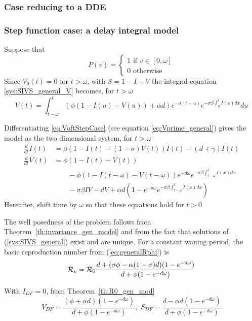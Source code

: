 \documentclass[aspectratio=169]{beamer}\usepackage[]{graphicx}\usepackage[]{xcolor}
\begin{document}
\subsubsection{Case reducing to a DDE}
\begin{frame}\frametitle{Step function case: a delay integral model}
Suppose that
\[ 
P(v)=
\left\{
\begin{array}{l}
1\textrm{ if }v\in[0,\omega] \\
0\textrm{ otherwise} 
\end{array}
\right.
\]
Since $V_0(t)=0$ for $t>\omega$, with $S=1-I-V$ the
integral equation \eqref{sys:SIVS_general_V} becomes, for $t>\omega$
\begin{equation}
  V(t)=\int_{t-\omega}^t(\phi (1-I(u)-V(u))+\alpha d)e^{-d(t-u)}
  e^{-\sigma\beta\int_u^tI(x)dx}du
  \label{eq:VoftStepCase}
\end{equation}
\end{frame}

\begin{frame}
Differentiating \eqref{eq:VoftStepCase} (see equation
\eqref{eq:Vprime_general}) gives the model as the two
dimensional system, for $t>\omega$
\begin{subequations}\label{sys:SIVS_DDE}
\begin{align}
  \frac{d}{dt}I(t) &= 
  \beta(1-I(t)-(1-\sigma)V(t))I(t)-(d+\gamma)I(t) \label{sys:SIVS_DDE_dS} \\
  \frac{d}{dt}V(t) &=
  \phi(1-I(t)-V(t)) \label{sys:SIVS_DDE_dV}\\
  &\qquad-\phi(1-I(t-\omega)-V(t-\omega))e^{-d\omega}
  e^{-\sigma\beta\int_{t-\omega}^t I(x)dx} \nonumber \\
  &\qquad -\sigma\beta IV-dV
  +\alpha d\left(1-e^{-d\omega}e^{-\sigma\beta\int_{t-\omega}^t I(x)dx}
  \right) \nonumber
\end{align}
\end{subequations}
Hereafter, shift time by $\omega$ so that these equations hold for $t>0$
\end{frame}


\begin{frame}
The well posedness of the problem follows from
Theorem~\ref{th:invariance_gen_model} and from the fact that solutions
of (\ref{sys:SIVS_general}) exist and are unique.
For a constant waning period, the basic reproduction number from
(\ref{eq:generalRphi}) is
\begin{equation}
 \mathcal{R}_v = \mathcal{R}_0
 \frac{d+(\sigma\phi-\alpha(1-\sigma)d)
 (1-e^{-d\omega})}{d+\phi(1-e^{-d\omega})}
 \label{eq:Rphi}
\end{equation}


With $I_{DF}=0$, from Theorem~\ref{th:R0_gen_mod}
\begin{equation}
 V_{DF}=\frac{(\phi+\alpha d)(1-e^{-d\omega})}{d+\phi(1-e^{-d\omega})}
,\,\,
S_{DF}=\frac{d-\alpha d(1-e^{-d\omega})}{d+\phi(1-e^{-d\omega})}
 \label{eq:DFE_V}
\end{equation}
\end{frame}
\end{document}
